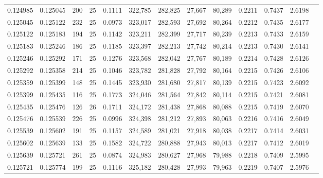 \begin{tabular}{rrrrrrrrrrrrr}
0.124985 & 0.125045 &   200 &  25 &                                     0.1111 & 322,785 & 282,825 &  27,667 &  80,289 & 0.2211 & 0.7437 & 2.6198 \\
0.125045 & 0.125122 &   232 &  25 &                                     0.0973 & 323,017 & 282,593 &  27,692 &  80,264 & 0.2212 & 0.7435 & 2.6177 \\
0.125122 & 0.125183 &   194 &  25 &                                     0.1142 & 323,211 & 282,399 &  27,717 &  80,239 & 0.2213 & 0.7433 & 2.6159 \\
0.125183 & 0.125246 &   186 &  25 &                                     0.1185 & 323,397 & 282,213 &  27,742 &  80,214 & 0.2213 & 0.7430 & 2.6141 \\
0.125246 & 0.125292 &   171 &  25 &                                     0.1276 & 323,568 & 282,042 &  27,767 &  80,189 & 0.2214 & 0.7428 & 2.6126 \\
0.125292 & 0.125358 &   214 &  25 &                                     0.1046 & 323,782 & 281,828 &  27,792 &  80,164 & 0.2215 & 0.7426 & 2.6106 \\
0.125359 & 0.125399 &   148 &  25 &                                     0.1445 & 323,930 & 281,680 &  27,817 &  80,139 & 0.2215 & 0.7423 & 2.6092 \\
0.125399 & 0.125435 &   116 &  25 &                                     0.1773 & 324,046 & 281,564 &  27,842 &  80,114 & 0.2215 & 0.7421 & 2.6081 \\
0.125435 & 0.125476 &   126 &  26 &                                     0.1711 & 324,172 & 281,438 &  27,868 &  80,088 & 0.2215 & 0.7419 & 2.6070 \\
0.125476 & 0.125539 &   226 &  25 &                                     0.0996 & 324,398 & 281,212 &  27,893 &  80,063 & 0.2216 & 0.7416 & 2.6049 \\
0.125539 & 0.125602 &   191 &  25 &                                     0.1157 & 324,589 & 281,021 &  27,918 &  80,038 & 0.2217 & 0.7414 & 2.6031 \\
0.125602 & 0.125639 &   133 &  25 &                                     0.1582 & 324,722 & 280,888 &  27,943 &  80,013 & 0.2217 & 0.7412 & 2.6019 \\
0.125639 & 0.125721 &   261 &  25 &                                     0.0874 & 324,983 & 280,627 &  27,968 &  79,988 & 0.2218 & 0.7409 & 2.5995 \\
0.125721 & 0.125774 &   199 &  25 &                                     0.1116 & 325,182 & 280,428 &  27,993 &  79,963 & 0.2219 & 0.7407 & 2.5976 \\

\end{tabular}
